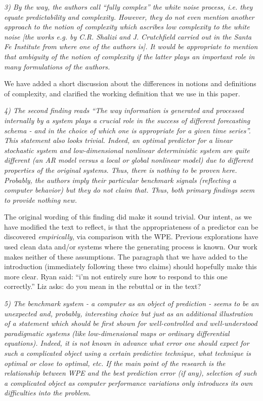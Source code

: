 \documentclass[12pt]{article}
\newcommand{\alert}[1]{{\color{red}#1}}
\begin{document}
\emph{3) By the way, the authors call ``fully complex'' the white
  noise process, i.e. they equate predictability and
  complexity. However, they do not even mention another approach to
  the notion of complexity which ascribes low complexity to the white
  noise [the works e.g. by C.R. Shalizi and J. Crutchfield carried out
    in the Santa Fe Institute from where one of the authors is]. It
  would be appropriate to mention that ambiguity of the notion of
  complexity if the latter plays an important role in many
  formulations of the authors.}

We have added a short discussion about the differences in notions and
definitions of complexity, and clarified the working definition that
we use in this paper.

\emph{4) The second finding reads ``The way information is generated
  and processed internally by a system plays a crucial role in the
  success of different forecasting schema - and in the choice of which
  one is appropriate for a given time series''. This statement also
  looks trivial. Indeed, an optimal predictor for a linear stochastic
  system and low-dimensional nonlinear deterministic system are quite
  different (an AR model versus a local or global nonlinear model) due
  to different properties of the original systems. Thus, there is
  nothing to be proven here. Probably, the authors imply their
  particular benchmark signals (reflecting a computer behavior) but
  they do not claim that.  Thus, both primary findings seem to provide
  nothing new.}

The original wording of this finding did make it sound trivial.  Our
intent, as we have modified the text to reflect, is that the
appropriateness of a predictor can be discovered \emph{empirically},
via comparison with the WPE.  Previous explorations have used clean
data and/or systems where the generating process is known.  Our work
makes neither of these assumptions.  The paragraph that we have added
to the introduction (immediately following these two claims) should
hopefully make this more clear.  \alert{Ryan said: ``i'm not entirely
  sure how to respond to this one correctly.''  Liz asks: do you mean
  in the rebuttal or in the text?}

\emph{5) The benchmark system - a computer as an object of prediction
  - seems to be an unexpected and, probably, interesting choice but
  just as an additional illustration of a statement which should be
  first shown for well-controlled and well-understood paradigmatic
  systems (like low-dimensional maps or ordinary differential
  equations). Indeed, it is not known in advance what error one should
  expect for such a complicated object using a certain predictive
  technique, what technique is optimal or close to optimal, etc. If
  the main point of the research is the relationship between WPE and
  the best prediction error (if any), selection of such a complicated
  object as computer performance variations only introduces its own
  difficulties into the problem.}
\end{document}
